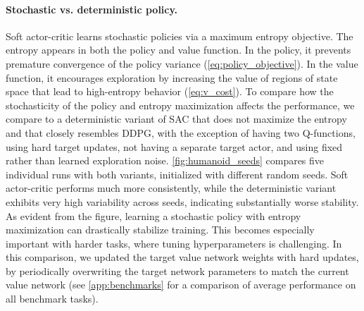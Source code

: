 \documentclass{article}
\begin{document}
\vspace{-0.1in}
\paragraph{Stochastic vs. deterministic policy.} Soft actor-critic learns stochastic policies via a maximum entropy objective. The entropy appears in both the policy and value function. In the policy, it prevents premature convergence of the policy variance (\autoref{eq:policy_objective}). In the value function, it encourages exploration by increasing the value of regions of state space that lead to high-entropy behavior (\autoref{eq:v_cost}). To compare how the stochasticity of the policy and entropy maximization affects the performance, we compare to a deterministic variant of SAC that does not maximize the entropy and that closely resembles DDPG, with the exception of having two Q-functions, using hard target updates, not having a separate target actor, and using fixed rather than learned exploration noise. \autoref{fig:humanoid_seeds} compares five individual runs with both variants, initialized with different random seeds. Soft actor-critic performs much more consistently, while the deterministic variant exhibits very high variability across seeds, indicating substantially worse stability. As evident from the figure, learning a stochastic policy with entropy maximization can drastically stabilize training. This becomes especially important with harder tasks, where tuning hyperparameters is challenging. In this comparison, we updated the target value network weights with hard updates, by periodically overwriting the target network parameters to match the current value network (see \autoref{app:benchmarks} for a comparison of average performance on all benchmark tasks). 

%
%

%
%

%
%
\end{document}
